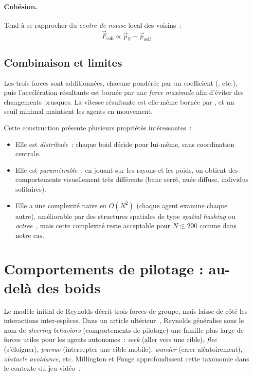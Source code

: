 \paragraph{Cohésion.} Tend à se rapprocher du \emph{centre de masse}
local des voisins~:
\[
  \vec{F}_{\text{coh}} \propto \overline{\vec{p}}_V - \vec{p}_{\text{self}}
\]

\subsection{Combinaison et limites}

Les trois forces sont additionnées, chacune pondérée par un
coefficient (, etc.), puis l'accélération
résultante est bornée par une \emph{force maximale} 
afin d'éviter des changements brusques. La vitesse résultante est
elle-même bornée par , et un seuil minimal
 maintient les agents en mouvement.

Cette construction présente plusieurs propriétés intéressantes~:

\begin{itemize}
  \item Elle est \emph{distribuée}~: chaque boid décide pour
    lui-même, sans coordination centrale.
  \item Elle est \emph{paramétrable}~: en jouant sur les rayons et
    les poids, on obtient des comportements visuellement très
    différents (banc serré, nuée diffuse, individus solitaires).
  \item Elle a une complexité naïve en $O(N^2)$ (chaque agent
    examine chaque autre), améliorable par des structures spatiales
    de type \emph{spatial hashing} ou \emph{octree}~\cite{ericson2004rtcd},
    mais cette complexité reste acceptable pour
    $N \lesssim 200$ comme dans notre cas.
\end{itemize}

\section{Comportements de pilotage : au-delà des boids}

Le modèle initial de Reynolds décrit trois forces de groupe, mais
laisse de côté les interactions inter-espèces. Dans un article
ultérieur~\cite{reynolds1999steering}, Reynolds généralise sous le
nom de \emph{steering behaviors} (comportements de pilotage) une
famille plus large de forces utiles pour les agents autonomes~: \emph{seek}
(aller vers une cible), \emph{flee} (s'éloigner), \emph{pursue}
(intercepter une cible mobile), \emph{wander} (errer aléatoirement),
\emph{obstacle avoidance}, etc. Millington et Funge approfondissent
cette taxonomie dans le contexte du jeu vidéo~\cite{millington2009ai}.

